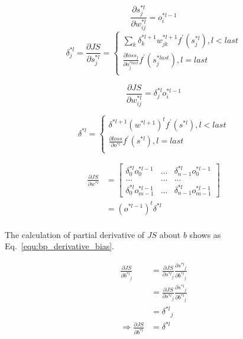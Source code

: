 \documentclass[runningheads,openany]{xhlPaper}
\begin{document}
\begin{equation}
\frac{\partial{s^{*l}_{j}}}{\partial{w^{*l}_{ij}}} = o^{*l-1}_{i}
\end{equation}
\begin{equation}
\delta^{*l}_{j} = \frac{\partial{JS}}{\partial{s^{*l}_{j}}} = \left\{
\begin{aligned}
\sum_{k}{\delta^{*l + 1}_{k}w^{*l + 1}_{jk}}f^{'}(s^{*l}_{j}), l < last\\
\frac{\partial{loss_{j}}}{\partial{o^{*last}_{j}}}f^{'}(s^{*last}_{j}), l = last\\
\end{aligned}
\right.
\end{equation}

\begin{equation}
\frac{\partial{JS}}{\partial{w^{*l}_{ij}}} = \delta^{*l}_{j}o^{*l - 1}_{i}
\end{equation}

\begin{equation}
\delta^{*l} = \left\{
\begin{aligned}
\delta^{*l + 1}(w^{*l + 1})^{t}f^{'}(s^{*l}), l < last\\
\frac{\partial{loss}}{\partial{o^{*l}}}f^{'}(s^{*l}), l = last\\
\end{aligned}
\right.
\end{equation}

\begin{equation}
\begin{aligned}
\frac{\partial{JS}}{\partial{w^{*l}}} &= 
\begin{bmatrix}
\delta^{*l}_{0}o^{*l - 1}_{0}& ... & \delta^{*l}_{n - 1}o^{*l - 1}_{0} \\
... & ... & ... \\
\delta^{*l}_{0}o^{*l - 1}_{m - 1} & ... & \delta^{*l}_{n - 1}o^{*l - 1}_{m - 1}
\end{bmatrix}\\
&= (o^{*l - 1})^{t}\delta^{*l}\\
\end{aligned}
\end{equation}

The calculation of partial derivative of $JS$ about $b$ shows as Eq.~\ref{equ:bp_derivative_bias}.

\begin{equation}
\label{equ:bp_derivative_bias}
\begin{aligned}
\frac{{\partial JS}}{{\partial {b^{*l}}_j}} &= \frac{{\partial JS}}{{\partial {s^{*l}}_j}}\frac{{\partial {s^{*l}}_j}}{{\partial {b^{*l}}_j}}\\
 &= \frac{{\partial JS}}{{\partial {s^{*l}}_j}}\frac{{\partial {s^{*l}}_j}}{{\partial {b^{*l}}_j}}\\
 &= {\delta ^{*l}}_j\\
 \Rightarrow \frac{{\partial JS}}{{\partial {b^{*l}}}} &= {\delta ^{*l}}
\end{aligned}
\end{equation}
\end{document}
